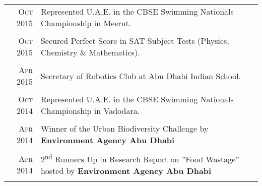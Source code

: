 \documentclass[a4paper,10pt]{article}
\begin{document}
\begin{tabular}{r|p{13.5cm}}
\textsc{Oct} 2015 & Represented U.A.E. in the CBSE Swimming Nationals Championship in Meerut.\\\multicolumn{2}{c}{}\\
\textsc{Oct} 2015 & Secured Perfect Score in SAT Subject Tests (Physics, Chemistry \& Mathematics).\\\multicolumn{2}{c}{}\\
\textsc{Apr} 2015 & Secretary of Robotics Club at Abu Dhabi Indian School. \\\multicolumn{2}{c}{}\\
\textsc{Oct} 2014 & Represented U.A.E. in the CBSE Swimming Nationals Championship in Vadodara.  \\\multicolumn{2}{c}{}\\
\textsc{Apr} 2014 & Winner of the Urban Biodiversity Challenge by \textbf{Environment Agency Abu Dhabi} \\\multicolumn{2}{c}{}\\
\textsc{Apr} 2014 & 2\textsuperscript{nd} Runners Up in Research Report on ''Food Wastage'' hosted by \textbf{Environment Agency Abu Dhabi} \\\multicolumn{2}{c}{}\\
\end{tabular}
\end{document}
